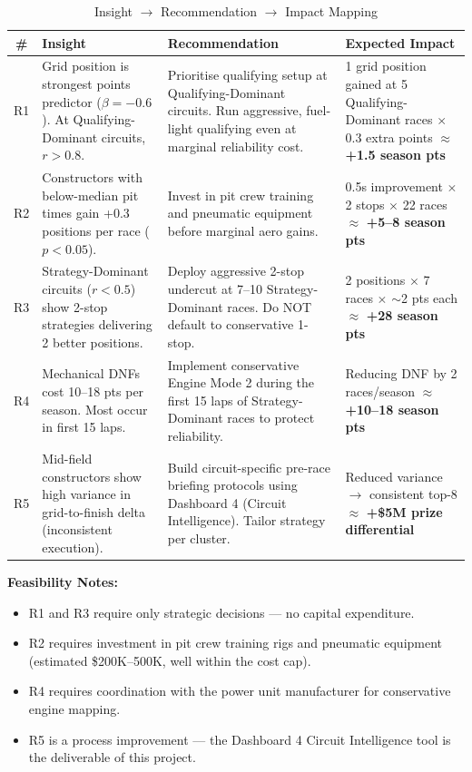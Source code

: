 \documentclass[12pt, a4paper]{article}
\begin{document}
\begin{table}[H]
\centering
\caption{Insight $\rightarrow$ Recommendation $\rightarrow$ Impact Mapping}
\small
\begin{tabularx}{\textwidth}{c X X X}
\toprule
\textbf{\#} & \textbf{Insight} & \textbf{Recommendation} & \textbf{Expected Impact} \\
\midrule
R1 & Grid position is strongest points predictor ($\beta = -0.6$). At Qualifying-Dominant circuits, $r > 0.8$. & Prioritise qualifying setup at Qualifying-Dominant circuits. Run aggressive, fuel-light qualifying even at marginal reliability cost. & 1 grid position gained at 5 Qualifying-Dominant races $\times$ 0.3 extra points $\approx$ \textbf{+1.5 season pts} \\[6pt]
R2 & Constructors with below-median pit times gain +0.3 positions per race ($p < 0.05$). & Invest in pit crew training and pneumatic equipment before marginal aero gains. & 0.5s improvement $\times$ 2 stops $\times$ 22 races $\approx$ \textbf{+5--8 season pts} \\[6pt]
R3 & Strategy-Dominant circuits ($r < 0.5$) show 2-stop strategies delivering 2 better positions. & Deploy aggressive 2-stop undercut at 7--10 Strategy-Dominant races. Do NOT default to conservative 1-stop. & 2 positions $\times$ 7 races $\times$ $\sim$2 pts each $\approx$ \textbf{+28 season pts} \\[6pt]
R4 & Mechanical DNFs cost 10--18 pts per season. Most occur in first 15 laps. & Implement conservative Engine Mode 2 during the first 15 laps of Strategy-Dominant races to protect reliability. & Reducing DNF by 2 races/season $\approx$ \textbf{+10--18 season pts} \\[6pt]
R5 & Mid-field constructors show high variance in grid-to-finish delta (inconsistent execution). & Build circuit-specific pre-race briefing protocols using Dashboard 4 (Circuit Intelligence). Tailor strategy per cluster. & Reduced variance $\rightarrow$ consistent top-8 $\approx$ \textbf{+\$5M prize differential} \\
\bottomrule
\end{tabularx}
\end{table}

\textbf{Feasibility Notes:}
\begin{itemize}[noitemsep]
    \item R1 and R3 require only strategic decisions --- no capital expenditure.
    \item R2 requires investment in pit crew training rigs and pneumatic equipment (estimated \$200K--500K, well within the cost cap).
    \item R4 requires coordination with the power unit manufacturer for conservative engine mapping.
    \item R5 is a process improvement --- the Dashboard 4 Circuit Intelligence tool is the deliverable of this project.
\end{itemize}
\end{document}
